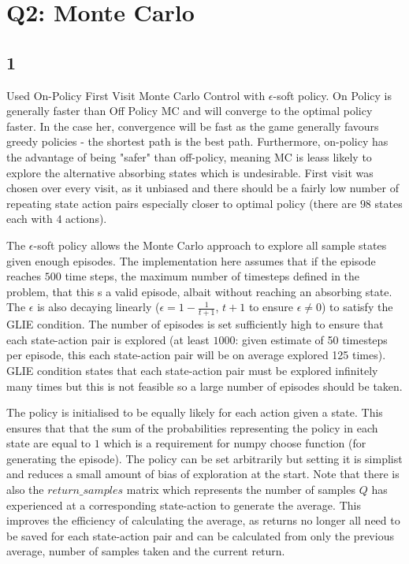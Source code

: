 \section*{Q2: Monte Carlo}
\subsection*{1}
Used On-Policy First Visit Monte Carlo Control with $\epsilon$-soft
policy. On Policy is generally faster than Off Policy MC and 
will converge to the optimal policy faster.
In the case her, convergence will be fast as the game generally
favours greedy policies - the shortest path is the best path.
Furthermore, on-policy has the advantage of being 
"safer" than off-policy, meaning MC is leass likely to 
explore the alternative absorbing states which is undesirable. 
First visit was chosen over every visit, as it unbiased and
there should be a fairly low number of repeating state action pairs
especially closer to optimal policy 
(there are $98$ states each with $4$ actions).

The $\epsilon$-soft policy allows the Monte Carlo approach
to explore all sample states given enough episodes.
The implementation here assumes that if the episode reaches $500$
time steps, the maximum number of timesteps defined in the problem,
that this s a valid episode, albait without reaching an absorbing 
state. The $\epsilon$ is also decaying linearly 
($\epsilon = 1 - \frac{1}{t + 1}$, $t + 1$ to ensure $\epsilon \ne 0$) 
to satisfy the GLIE condition. The number of episodes is set 
sufficiently high to ensure that each state-action 
pair is explored
(at least $1000$: given estimate of 50 timesteps
per episode, this each state-action pair will be on average explored
125 times). 
GLIE condition states that each state-action pair
must be explored infinitely many times but this is not feasible 
so a large number of episodes should be taken. 

The policy is initialised to be equally likely for each action 
given a state. This ensures that that the sum of the probabilities
representing the policy in each state are equal to $1$ which is a 
requirement for numpy choose function (for generating the episode).
The policy can be set arbitrarily but setting it is simplist and
reduces a small amount of bias of exploration at the start.
Note that there is also the $return\_samples$ matrix which represents
the number of samples $Q$ has experienced at a corresponding 
state-action to generate the average. This improves the efficiency
of calculating the average, as returns no longer all need to be
saved for each state-action pair and can be calculated from 
only the previous average, number of samples taken and the current
return. 


